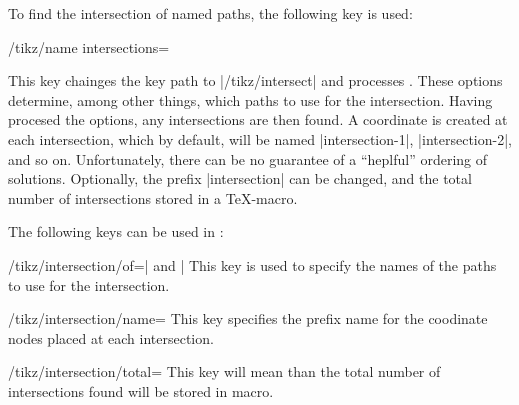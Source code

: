   To find the intersection of named paths, the following key is used:

\begin{key}{/tikz/name intersections=}
  
  This key chainges the key path to |/tikz/intersect| and processes
  . These options determine, among other things,
  which paths to use for the intersection. Having procesed the 
  options, any intersections are then found. A coordinate is created 
  at each intersection, which by default, will be named 
  |intersection-1|, |intersection-2|, and so on. Unfortunately, there
  can be no guarantee of a ``heplful'' ordering of solutions.
  Optionally, the prefix |intersection| can be changed, and the 
  total number of intersections stored in a \TeX-macro. 

\begin{codeexample}[]
\end{codeexample}

\end{key}

  The following keys can be used in :
  
\begin{key}{/tikz/intersection/of=| and |}
  This key is used to specify the names of the paths to use for
  the intersection.
\end{key}

\begin{key}{/tikz/intersection/name=}
  This key specifies the prefix name for the coodinate nodes placed
  at each intersection.
\end{key}

\begin{key}{/tikz/intersection/total=}
  This key will mean than the total number of intersections found
  will be stored in macro.
\end{key}

\begin{codeexample}[]
\end{codeexample}

